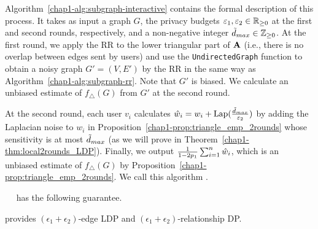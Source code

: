 Algorithm~\ref{chap1-alg:subgraph-interactive} contains the formal
description of this process. 
It takes as input a graph $G$, 
the privacy budgets $\varepsilon_1, \varepsilon_2 \in \mathbb{R}_{\ge0}$ at the first and second rounds, respectively, 
and 
a non-negative integer $\tilde{d}_{max} \in \mathbb{Z}_{\ge0}$. 
At the first round, we 
apply the RR to the lower triangular part of $\mathbf{A}$ 
(i.e., there is no overlap between edges sent by users) 
and use the \texttt{UndirectedGraph} function to 
obtain a noisy graph $G'=(V,E')$ by the RR in the same way as Algorithm~\ref{chap1-alg:subgraph-rr}. 
Note that $G'$ is biased. 
We calculate an unbiased estimate of $f_\triangle(G)$ from $G'$ at the second round.  

At the second round, each user $v_i$ 
calculates $\hat{w}_i = w_i + \textrm{Lap}(\frac{\tilde{d}_{max}}{\varepsilon_2})$ 
by adding the Laplacian noise to $w_i$ 
in Proposition~\ref{chap1-prop:triangle_emp_2rounds} 
whose 
sensitivity is at most 
$\tilde{d}_{max}$ 
(as we will prove in Theorem~\ref{chap1-thm:local2rounds_LDP}). 
Finally, we output $\frac{1}{1-2p_1}\sum_{i=1}^n \hat{w}_i$, which is an unbiased estimate of $f_\triangle(G)$ by Proposition~\ref{chap1-prop:triangle_emp_2rounds}. 
We call this algorithm .


\smallskip
{}~~ 
has the following 
guarantee.

\begin{theorem}\label{chap1-thm:local2rounds_LDP}
  provides $(\epsilon_1 + \epsilon_2)$-edge LDP and $(\epsilon_1 + \epsilon_2)$-relationship DP.
\end{theorem}

